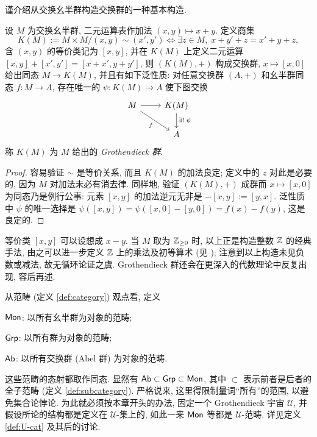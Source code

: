 谨介绍从交换幺半群构造交换群的一种基本构造.
\begin{definition-theorem}\label{def:K-group}
	设 $M$ 为交换幺半群, 二元运算表作加法 $(x,y) \mapsto x+y$. 定义商集
	\[ K(M) := M \times M \bigg/ (x,y) \sim (x',y') \iff \exists z \in M,\; x+y'+z=x'+y+z, \]
	含 $(x,y)$ 的等价类记为 $[x,y]$, 并在 $K(M)$ 上定义二元运算 $[x,y] + [x',y'] = [x+x',y+y']$, 则 $(K(M),+)$ 构成交换群, $x \mapsto [x,0]$ 给出同态 $M \to K(M)$, 并且有如下泛性质: 对任意交换群 $(A,+)$ 和幺半群同态 $f: M \to A$, 存在唯一的 $\psi: K(M) \to A$ 使下图交换
	\[ \begin{tikzcd}
		M \arrow[r] \arrow[rd, "f"'] & K(M) \arrow[d, "\exists!\;\psi"] \\
		& A
	\end{tikzcd}\]
	称 $K(M)$ 为 $M$ 给出的 \emph{Grothendieck 群}.
\end{definition-theorem}
\begin{proof}
	容易验证 $\sim$ 是等价关系, 而且 $K(M)$ 的加法良定; 定义中的 $z$ 对此是必要的, 因为 $M$ 对加法未必有消去律. 同样地, 验证 $(K(M), +)$ 成群而 $x \mapsto [x,0]$ 为同态乃是例行公事: 元素 $[x,y]$ 的加法逆元无非是 $-[x,y] := [y,x]$. 泛性质中 $\psi$ 的唯一选择是 $\psi([x,y]) = \psi([x,0]-[y,0]) = f(x)-f(y)$, 这是良定的.
\end{proof}
等价类 $[x,y]$ 可以设想成 $x-y$. 当 $M$ 取为 $\mathbb{Z}_{\geq 0}$ 时, 以上正是构造整数 $\mathbb{Z}$ 的经典手法, 由之可以进一步定义 $\mathbb{Z}$ 上的乘法及初等算术 (见 \cite[第零章, \S 3]{DN00}); 注意到以上构造未见负数或减法, 故无循环论证之虞. Grothendieck 群还会在更深入的代数理论中反复出现, 容后再述.

\begin{remark}\label{rem:grp-cat}
	从范畴 (定义 \ref{def:category}) 观点看, 定义
	\begin{compactitem}
		\item $\mathsf{Mon}$: 以所有幺半群为对象的范畴;
		\item $\mathsf{Grp}$: 以所有群为对象的范畴;
		\item $\mathsf{Ab}$: 以所有交换群 (Abel 群) 为对象的范畴.
	\end{compactitem}
	这些范畴的态射都取作同态. 显然有 $\mathsf{Ab} \subset \mathsf{Grp} \subset \mathsf{Mon}$, 其中 $\subset$ 表示前者是后者的全子范畴 (定义 \ref{def:subcategory}). 严格说来, 这里得限制量词``所有''的范围, 以避免集合论悖论. 为此就必须按本章开头的办法, 固定一个 Grothendieck 宇宙 $\mathcal{U}$, 并假设所论的结构都是定义在 $\mathcal{U}$-集上的, 如此一来 $\mathsf{Mon}$ 等都是 $\mathcal{U}$-范畴. 详见定义 \ref{def:U-cat} 及其后的讨论.
\end{remark}

